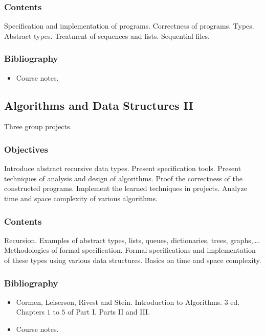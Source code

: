 \documentclass[spanish]{article}
\begin{document}
\subsubsection{Contents}
Specification and implementation of programs. Correctness of programs. Types.
Abstract types. Treatment of sequences and lists. Sequential files.

\subsubsection{Bibliography}
\begin{itemize}
  \item Course notes.
\end{itemize}


\hrulefill%

\subsection{Algorithms and Data Structures II}
Three group projects.

\subsubsection{Objectives}
Introduce abstract recursive data types. Present specification tools.
Present techniques of analysis and design of algorithms. Proof the correctness
of the constructed programs. Implement the learned techniques in projects.
Analyze time and space complexity of various algorithms.

\subsubsection{Contents}
Recursion. Examples of abstract types, lists, queues, dictionaries,
trees, graphs,\ldots. Methodologies of formal specification.
Formal specifications and implementation of these types using various
data structures. Basics on time and space complexity.

\subsubsection{Bibliography}
\begin{itemize}
  \item Cormen, Leiserson, Rivest and Stein. Introduction to Algorithms. 3 ed.\\
    Chapters $1$ to $5$ of Part I. Parts II and III.
  \item Course notes.
\end{itemize}
\end{document}
